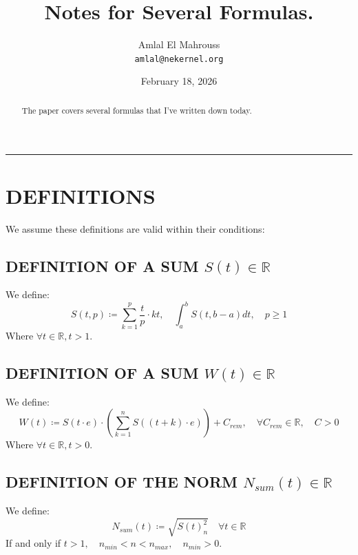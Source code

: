 \documentclass[11pt, a4paper]{article}
\title{Notes for Several Formulas.}
\author{Amlal El Mahrouss\\\texttt{amlal@nekernel.org}}
\date{February 18, 2026}
\begin{document}
\maketitle

\begin{center}
	\rule[0.01cm]{17cm}{0.01cm}
\end{center}

\begin{abstract}
\begin{center}
    The paper covers several formulas that I've written down today.
\end{center}
\end{abstract}

\section{DEFINITIONS}

We assume these definitions are valid within their conditions:

\subsection{DEFINITION OF A SUM $S(t) \in \mathbb{R}$}
We define:
\begin{equation}
    S(t, p) \coloneqq \sum_{k=1}^{p}\frac{t}{p}\cdot kt, \quad \int_{a}^{b}S(t, b - a)dt, \quad p \geq 1
\end{equation}
Where $\forall t \in \mathbb{R}, t > 1$.

\subsection{DEFINITION OF A SUM $W(t) \in \mathbb{R}$}
We define:
\begin{equation}
    W(t) \coloneqq S(t \cdot e)\cdot(\sum_{k=1}^{n} S((t+k)\cdot e)) +C_{rem}, \quad \forall C_{rem} \in \mathbb{R}, \quad C > 0
\end{equation}
Where $\forall t \in \mathbb{R}, t > 0$.

\subsection{DEFINITION OF THE NORM $N_{sum}(t) \in \mathbb{R}$}

We define:
\begin{equation}
    N_{sum}(t) \coloneqq \sqrt{S(t)^2_{n}} \quad \forall t \in \mathbb{R}
\end{equation}
If and only if $t > 1, \quad n_{min} < n < n_{max}, \quad n_{min} > 0$.
\end{document}
